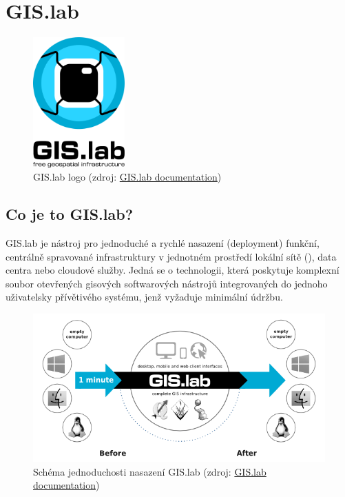 \chapter{GIS.lab}
\label{2-teorie}

\begin{figure}[H] \centering
    \includegraphics[width=100pt]{./pictures/gislab-logo.png}
    \caption[GIS.lab logo]{GIS.lab logo (zdroj:
	\href{https://gislab.readthedocs.io/en/latest/_images/gislab-schema.png}{GIS.lab documentation})}
	\label{fig:gislab-logo}
\end{figure}

\section{Co je to GIS.lab?}

GIS.lab je nástroj pro jednoduché a rychlé nasazení (deployment) funkční, centrálně spravované  infrastruktury v jednotném prostředí lokální sítě (), data centra nebo cloudové služby. Jedná se o technologii, která poskytuje komplexní soubor otevřených gisových softwarových nástrojů integrovaných do jednoho uživatelsky přívětivého systému, jenž vyžaduje minimální údržbu.

\begin{figure}[H] \centering
    \includegraphics[width=450pt]{./pictures/gislab-schema.png}
    \caption[Schéma jednoduchosti nasazení GIS.lab]{Schéma jednoduchosti nasazení GIS.lab (zdroj:
	\href{https://gislab.readthedocs.io/en/latest/_images/gislab-schema.png}{GIS.lab documentation})}
	\label{fig:gislab-schema}
\end{figure}

